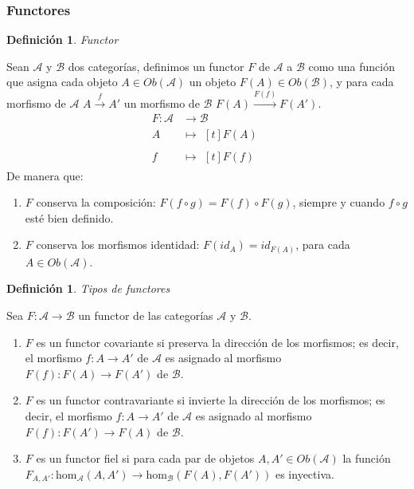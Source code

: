 \documentclass[11pt,a4paper,openright,oneside]{article}
\numberwithin{equation}{section}
\newtheorem{defi}[teo]{Definici\'on}
\theoremstyle{definition}
\begin{document}
\subsubsection{Functores}
\begin{defi}
    Functor
\end{defi}
Sean $\mathcal{A}$ y $\mathcal{B}$ dos categor\'ias, definimos un functor $F$ de $\mathcal{A}$ a $\mathcal{B}$ como una funci\'on que asigna cada objeto $A \in\mathit{Ob}(\mathcal{A})$ un objeto $F(A) \in\mathit{Ob}(\mathcal{B})$,
y para cada morfismo de $\mathcal{A}$ $A \overset{f}{\longrightarrow} A'$ un morfismo de $\mathcal{B}$ $F(A) \overset{F(f)}{\longrightarrow} F(A')$.
\begin{align*}
    F: \mathcal{A} & \longrightarrow \mathcal{B} \\
    A              & \longmapsto\!
    \begin{aligned}[t]
        F(A)
    \end{aligned}                    \\
    f              & \longmapsto\!
    \begin{aligned}[t]
        F(f)
    \end{aligned}
\end{align*}
De manera que:

\begin{enumerate}[(1)]
    \item $F$ conserva la composici\'on: $F(f\circ g) = F(f)\circ F(g)$, siempre y cuando $f\circ g$ est\'e bien definido.
    \item $F$ conserva los morfismos identidad: $F(\mathit{id}_A)=\mathit{id}_{F(A)}$, para cada $A \in\mathit{Ob}(\mathcal{A})$.
\end{enumerate}
\begin{defi}
    Tipos de functores
\end{defi}
Sea $F: \mathcal{A}\longrightarrow\mathcal{B}$ un functor de las categor\'ias $\mathcal{A}$ y $\mathcal{B}$.

\begin{enumerate}[(1)]
    \item $F$ es un functor covariante si preserva la direcci\'on de los morfismos; es decir, el morfismo $f: A \longrightarrow A'$ de $\mathcal{A}$ es asignado al morfismo $F(f): F(A) \longrightarrow F(A')$ de $\mathcal{B}$.
    \item $F$ es un functor contravariante si invierte la direcci\'on de los morfismos; es decir, el morfismo $f: A \longrightarrow A'$ de $\mathcal{A}$ es asignado al morfismo $F(f): F(A') \longrightarrow F(A)$ de $\mathcal{B}$.
    \item $F$ es un functor fiel si para cada par de objetos $A, A'\in\mathit{Ob}(\mathcal{A})$ la funci\'on $F_{A,A'}: \text{hom}_{\mathcal{A}}(A, A') \longrightarrow\text {hom}_{\mathcal{B}}(F(A), F(A'))$ es inyectiva.
\end{enumerate}
\end{document}
